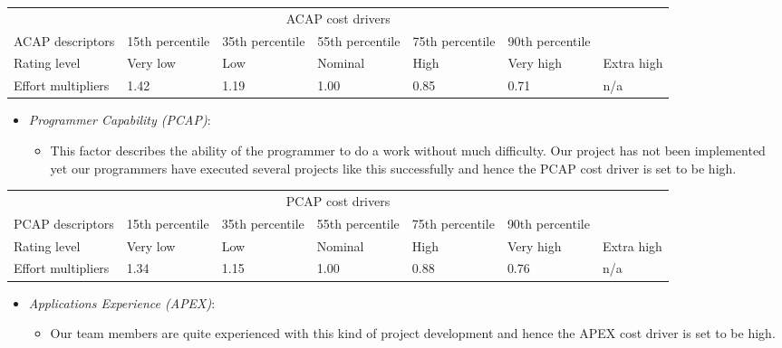 \begin{table}[H]
	\hspace*{-1.7cm}
	\begin{tabular}{|p{2cm}|p{2cm}|p{2cm}|p{2cm}|p{2cm}|p{2cm}|p{2cm}|}
		\hline
		\multicolumn{7}{|c|}{ACAP cost drivers} \\
		\hhline{|=======|}
		ACAP descriptors & 15th percentile & 35th percentile & 55th percentile & 75th percentile & 90th percentile & \\
		\hline
		Rating level & Very low & Low & Nominal & High & Very high & Extra high \\
		\hline
		Effort multipliers & 1.42 & 1.19 & 1.00 & 0.85 & 0.71 & n/a \\
		\hline
	\end{tabular}
\end{table}

\begin{itemize}
	\item \emph{Programmer Capability (PCAP)}:
	\begin{itemize}
		\item[] This factor describes the ability of the programmer to do a work without much difficulty. Our project has not been implemented yet our programmers
have executed several projects like this successfully and hence the PCAP cost driver is set to be high.
	\end{itemize}
\end{itemize}

\begin{table}[H]
	\hspace*{-1.7cm}
	\begin{tabular}{|p{2cm}|p{2cm}|p{2cm}|p{2cm}|p{2cm}|p{2cm}|p{2cm}|}
		\hline
		\multicolumn{7}{|c|}{PCAP cost drivers} \\
		\hhline{|=======|}
		PCAP descriptors & 15th percentile & 35th percentile & 55th percentile & 75th percentile & 90th percentile & \\
		\hline
		Rating level & Very low & Low & Nominal & High & Very high & Extra high \\
		\hline
		Effort multipliers & 1.34 & 1.15 & 1.00 & 0.88 & 0.76 & n/a \\
		\hline
	\end{tabular}
\end{table}

\begin{itemize}
	\item \emph{Applications Experience (APEX)}:
	\begin{itemize}
		\item[] Our team members are quite experienced with this kind of project development and hence the  APEX cost driver is set to be high.
	\end{itemize}
\end{itemize}

